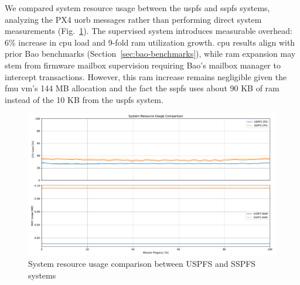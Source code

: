 We compared system resource usage between the \gls{uspfs} and \gls{sspfs}
systems, analyzing the PX4 \gls{uorb} messages rather than performing direct
system measurements (Fig.~\ref{fig:sys-resources-cmp}).
The supervised system introduces measurable overhead: 6\% increase in \gls{cpu}
load and 9-fold \gls{ram} utilization growth. \gls{cpu}
results align with prior Bao benchmarks (Section~\ref{sec:bao-benchmarks}),
while \gls{ram} expansion may stem from firmware mailbox supervision requiring
Bao's mailbox manager to intercept transactions.
However, this \gls{ram} increase remains negligible given the \gls{fmu}
\gls{vm}'s 144 MB allocation and the fact the \gls{sspfs} uses about 90 KB of \gls{ram}
instead of the 10 KB from the \gls{uspfs} system.

\begin{figure}[!hbt]
  \centering
  \includegraphics[width=1.0\textwidth]{./img/pdf/sys-resources-cmp} 
  \caption{System resource usage comparison between USPFS and SSPFS systems}%
  \label{fig:sys-resources-cmp}
\end{figure}

